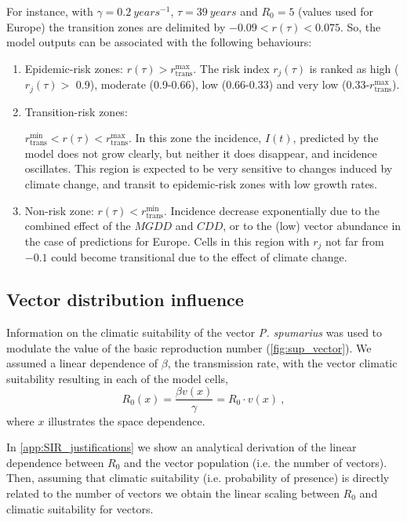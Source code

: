 For instance, with $\gamma=\SI{0.2}{years^{-1}}$, $\tau=\SI{39}{years}$ and
$R_0=5$ (values used for Europe) the transition zones are delimited by
$-0.09<r(\tau)<0.075$. So, the model outputs can be associated with the
following behaviours:
\begin{enumerate}
    \item Epidemic-risk zones: $r(\tau)>r_{\textrm{trans}}^{\textrm{max}}$.
          The risk index $r_j(\tau)$ is ranked as high ($r_j(\tau) >$ 0.9),
          moderate
          (0.9-0.66), low (0.66-0.33) and very low
          (0.33-$r_{\textrm{trans}}^{\textrm{max}}$).
    \item Transition-risk zones:

          $r_{\textrm{trans}}^{\textrm{min}}<r(\tau)<r_{\textrm{trans}}^{\textrm{max}}$.
          In this zone the incidence, $I(t)$, predicted by the model does not
          grow
          clearly, but neither it does disappear, and incidence oscillates.
          This region
          is expected to be very sensitive to changes induced by climate
          change, and
          transit to epidemic-risk zones with low growth rates.
    \item Non-risk zone: $r(\tau)<r_{\textrm{trans}}^{\textrm{min}}$.
          Incidence decrease exponentially due to the combined effect of the
          $MGDD$ and
          $CDD$, or to the (low) vector abundance in the case of predictions
          for Europe.
          Cells in this region with $r_j$ not far from $-0.1$ could become
          transitional
          due to the effect of climate change.
\end{enumerate}

\subsection{Vector distribution influence}\label{app:vector_influence}

Information on the climatic suitability of the vector \textit{P. spumarius}
\cite{Godefroid2021} was used to modulate the value of the basic reproduction
number (\cref{fig:sup_vector}). We assumed a linear dependence of $\beta$, the
transmission rate, with
the vector climatic suitability resulting in each of the model cells,
\begin{equation}
    R_0(x)=\frac{\beta v(x)}{\gamma}=R_0\cdot v(x) \ ,
\end{equation}
where $x$ illustrates the space dependence.

In \cref{app:SIR_justifications} we show an analytical derivation of the
linear dependence between $R_0$ and the vector population (i.e. the number of
vectors). Then, assuming that climatic suitability (i.e. probability of
presence) is directly related to the number of vectors we obtain the linear
scaling between $R_0$ and climatic suitability for vectors.


